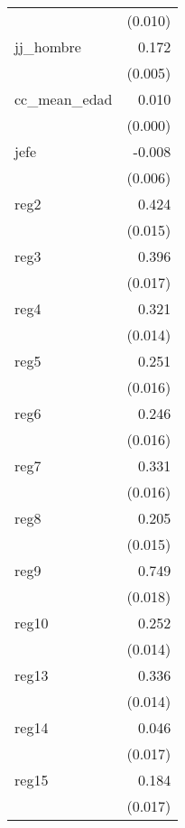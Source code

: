 {\begin{longtable}{l*{1}{D{.}{.}{-1}}}
            &     (0.010)         \\
\addlinespace
jj\_hombre   &       0.172\sym{***}\\
            &     (0.005)         \\
\addlinespace
cc\_mean\_edad&       0.010\sym{***}\\
            &     (0.000)         \\
\addlinespace
jefe        &      -0.008         \\
            &     (0.006)         \\
\addlinespace
reg2        &       0.424\sym{***}\\
            &     (0.015)         \\
\addlinespace
reg3        &       0.396\sym{***}\\
            &     (0.017)         \\
\addlinespace
reg4        &       0.321\sym{***}\\
            &     (0.014)         \\
\addlinespace
reg5        &       0.251\sym{***}\\
            &     (0.016)         \\
\addlinespace
reg6        &       0.246\sym{***}\\
            &     (0.016)         \\
\addlinespace
reg7        &       0.331\sym{***}\\
            &     (0.016)         \\
\addlinespace
reg8        &       0.205\sym{***}\\
            &     (0.015)         \\
\addlinespace
reg9        &       0.749\sym{***}\\
            &     (0.018)         \\
\addlinespace
reg10       &       0.252\sym{***}\\
            &     (0.014)         \\
\addlinespace
reg13       &       0.336\sym{***}\\
            &     (0.014)         \\
\addlinespace
reg14       &       0.046\sym{**} \\
            &     (0.017)         \\
\addlinespace
reg15       &       0.184\sym{***}\\
            &     (0.017)         \\

\end{longtable}}
